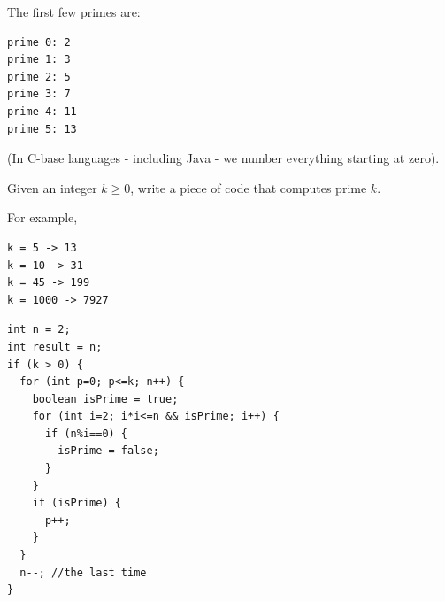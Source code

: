 \begin{questions}
The first few primes are:

\begin{verbatim}
prime 0: 2
prime 1: 3
prime 2: 5
prime 3: 7
prime 4: 11
prime 5: 13
\end{verbatim}
 
(In C-base languages - including Java - we number everything starting at zero).

Given an integer $k \geq 0$, write a piece of code that computes prime $k$.

For example,

\begin{verbatim}
k = 5 -> 13
k = 10 -> 31
k = 45 -> 199
k = 1000 -> 7927
\end{verbatim}

\begin{solution}
\begin{lstlisting}
int n = 2;
int result = n;
if (k > 0) {
  for (int p=0; p<=k; n++) {
    boolean isPrime = true;
    for (int i=2; i*i<=n && isPrime; i++) {
      if (n%i==0) {
        isPrime = false;
      }
    }
    if (isPrime) {
      p++;
    }
  }
  n--; //the last time
}
\end{lstlisting}
\end{solution}

\end{questions}

